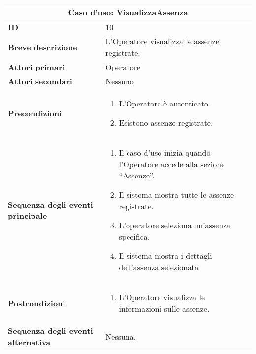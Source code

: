 \documentclass[a4paper]{report}
\begin{document}
\clearpage
\begin{table}[H]
\vspace*{-0cm}
\renewcommand{\arraystretch}{1.9}
\begin{tabular}{|p{3.9cm}|p{9.9cm}|}
\hline
\multicolumn{2}{|c|}{\textbf{Caso d’uso: VisualizzaAssenza}} \\ \hline
\textbf{ID} & 10 \\ \hline
\textbf{Breve descrizione} & L’Operatore visualizza le assenze registrate. \\ \hline
\textbf{Attori primari} & Operatore \\ \hline
\textbf{Attori secondari} & Nessuno \\ \hline
\textbf{Precondizioni} & \begin{enumerate}[leftmargin=14pt,label=\arabic*.,labelsep=0.5em,topsep=0pt,partopsep=0pt,parsep=0pt,itemsep=0pt]
    \item L’Operatore è autenticato.
    \item Esistono assenze registrate.
\end{enumerate} \\ \hline
\textbf{Sequenza degli eventi principale} & \begin{enumerate}[leftmargin=14pt,label=\arabic*.,labelsep=0.5em,topsep=0pt,partopsep=0pt,parsep=0pt,itemsep=0pt]
    \item Il caso d’uso inizia quando l’Operatore accede alla sezione “Assenze”.
    \item Il sistema mostra tutte le assenze registrate.
    \item L’operatore seleziona un’assenza specifica.
    \item Il sistema mostra i dettagli dell’assenza selezionata
\end{enumerate} \\ \hline
\textbf{Postcondizioni} & \begin{enumerate}[label=\arabic*.,leftmargin=14pt,labelsep=0.5em,topsep=0pt,partopsep=0pt,parsep=0pt,itemsep=0pt]
        \item L’Operatore visualizza le informazioni sulle assenze.
\end{enumerate} \\ \hline
\textbf{Sequenza degli eventi alternativa} & Nessuna. \\ \hline
\end{tabular}
\end{table}
\end{document}
